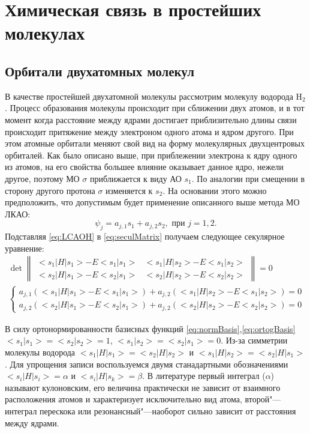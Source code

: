 \section{Химическая связь в простейших молекулах}

\subsection{Орбитали двухатомных молекул}

В качестве простейшей двухатомной молекулы рассмотрим молекулу водорода H${}_2$. 
Процесс образования молекулы происходит при сближении двух атомов, и в тот момент когда расстояние между ядрами достигает приблизительно длины связи происходит притяжение между электроном одного атома и ядром другого. 
При этом атомные орбитали меняют свой вид на форму молекулярных двухцентровых орбиталей. 
Как было описано выше, при приблежении электрона к ядру одного из атомов, на его свойства большее влияние оказывает данное ядро, нежели другое, поэтому МО $\sigma$ приближается к виду АО $s_1$. По аналогии при смещении в сторону другого протона $\sigma$ изменяется к $s_2$. 
На основании этого можно предположить, что допустимым будет применение описанного выше метода МО ЛКАО:
\begin{equation}
\label{eq:LCAOH}
\psi_j=a_{j,1}s_1+a_{j,2}s_2, \text{ при } j=1,2.
\end{equation} 
Подставляя \ref{eq:LCAOH} в \ref{eq:seculMatrix} получаем следующее секулярное уравнение:
\begin{eqnarray}
\label{eq:seculMatrixH}
\det 
\begin{Vmatrix}
<s_1|H|s_1>-E<s_1|s_1> & <s_1|H|s_2>-E<s_1|s_2> \\
<s_2|H|s_1>-E<s_2|s_1> & <s_2|H|s_2>-E<s_2|s_2>
\end{Vmatrix}=0\\
\label{eq:seqEqH}
\left\{\begin{matrix}
a_{j,1}(<s_1|H|s_1>-E<s_1|s_1>) +  a_{j,2}(<s_1|H|s_2>-E<s_1|s_2>)=0 \\
a_{j,2}(<s_2|H|s_1>-E<s_2|s_1>) +  a_{j,2}(<s_2|H|s_2>-E<s_2|s_2>)=0
\end{matrix}\right.
\end{eqnarray}

В силу ортонормированности базисных функций \ref{eq:normBasis},\ref{eq:ortogBasis} $<s_1|s_1>=<s_2|s_2>=1$, $<s_1|s_2>=<s_2|s_1>=0$. 
Из-за симметрии молекулы водорода $<s_1|H|s_1>=<s_2|H|s_2>$ и $<s_1|H|s_2>=<s_2|H|s_1>$. 
Для упрощения записи воспользуемся двумя станадартными обозначениями $<s_i|H|s_i>=\alpha$ и $<s_i|H|s_k>=\beta$. 
В литературе \cite{streitviser1965} первый интеграл ($\alpha$) называют кулоновским, его величина практически не зависит от взаимного расположения атомов и характеризует исключительно вид атома, второй"---интеграл перескока или резонансный"---наоборот сильно зависит от расстояния между ядрами. 

